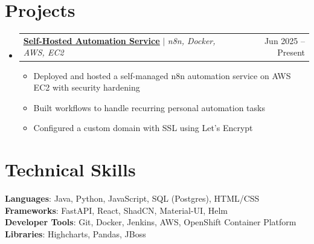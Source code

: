 \documentclass[letterpaper,11pt]{article}
\makeatletter
\newcommand{\resumeItem}[1]{
  \item\small{
    {#1 \vspace{-2pt}}
  }
}
\newcommand{\resumeProjectHeading}[2]{
    \item
    \begin{tabular*}{0.97\textwidth}{l@{\extracolsep{\fill}}r}
      \small#1 & #2 \\
    \end{tabular*}\vspace{-7pt}
}
\newcommand{\resumeSubHeadingListStart}{\begin{itemize}[leftmargin=0.15in, label={}]}
\newcommand{\resumeSubHeadingListEnd}{\end{itemize}}
\newcommand{\resumeItemListStart}{\begin{itemize}}
\newcommand{\resumeItemListEnd}{\end{itemize}\vspace{-5pt}}
\makeatother
\begin{document}
\section{Projects}
    \resumeSubHeadingListStart
      \resumeProjectHeading
          {\textbf{\href{https://n8n.labsofdhiru.in/}{\underline{Self-Hosted Automation Service}} } $|$ \emph{n8n, Docker, AWS, EC2}}{Jun 2025 -- Present}
          \resumeItemListStart
            \resumeItem{Deployed and hosted a self-managed n8n automation service on AWS EC2 with security hardening}
            \resumeItem{Built workflows to handle recurring personal automation tasks}
            \resumeItem{Configured a custom domain with SSL using Let's Encrypt}
          \resumeItemListEnd
    \resumeSubHeadingListEnd

\section{Technical Skills}
 \begin{itemize}[leftmargin=0.15in, label={}]
    \small{\item{
     \textbf{Languages}{: Java, Python, JavaScript, SQL (Postgres), HTML/CSS} \\
     \textbf{Frameworks}{: FastAPI, React, ShadCN, Material-UI, Helm} \\
     \textbf{Developer Tools}{: Git, Docker, Jenkins, AWS, OpenShift Container Platform} \\
     \textbf{Libraries}{: Highcharts, Pandas, JBoss}
    }}
 \end{itemize}


\end{document}
